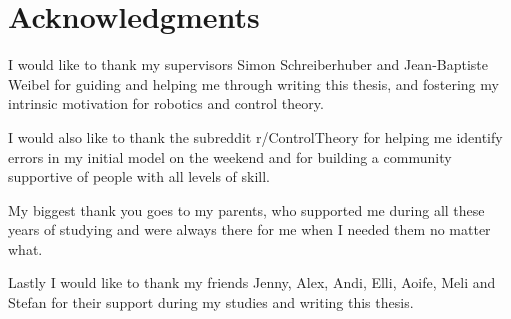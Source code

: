 \documentclass[class=report, crop=false]{standalone}
\begin{document}
\chapter{Acknowledgments}\label{cha:acknowledgements}

I would like to thank my supervisors Simon Schreiberhuber and Jean-Baptiste Weibel for guiding and helping me through writing this thesis, and fostering my intrinsic motivation for robotics and control theory.

I would also like to thank the subreddit r/ControlTheory for helping me identify errors in my initial model on the weekend and for building a community supportive of people with all levels of skill.

My biggest thank you goes to my parents, who supported me during all these years of studying and were always there for me when I needed them no matter what.

Lastly I would like to thank my friends Jenny, Alex, Andi, Elli, Aoife, Meli and Stefan for their support during my studies and writing this thesis.
\end{document}
